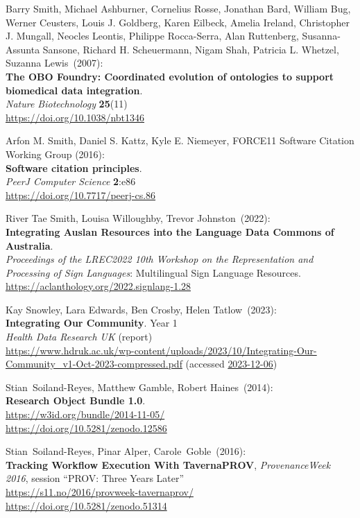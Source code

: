 \begin{thebibliography}{9}
Barry Smith, Michael Ashburner, Cornelius Rosse, Jonathan Bard, William
Bug, Werner Ceusters, Louis J. Goldberg, Karen Eilbeck, Amelia Ireland,
Christopher J. Mungall, Neocles Leontis, Philippe Rocca-Serra, Alan
Ruttenberg, Susanna-Assunta Sansone, Richard H. Scheuermann, Nigam Shah,
Patricia L. Whetzel, Suzanna Lewis~(2007): \\
\textbf{The {OBO Foundry}:
Coordinated evolution of ontologies to support biomedical data
integration}. \\
\emph{Nature Biotechnology} \textbf{25}(11) \\
\url{https://doi.org/10.1038/nbt1346}

Arfon M. Smith, Daniel S. Kattz, Kyle E. Niemeyer, FORCE11 Software Citation Working Group (2016):\\
\textbf{Software citation principles}.\\
\emph{PeerJ Computer Science} \textbf{2}:e86\\
\url{https://doi.org/10.7717/peerj-cs.86}

River Tae Smith, Louisa Willoughby, Trevor Johnston~(2022): \\
\textbf{Integrating Auslan Resources into the Language Data Commons of Australia}.\\
\emph{Proceedings of the LREC2022 10th Workshop on the Representation and Processing of Sign Languages}: Multilingual Sign Language Resources.\\
\url{https://aclanthology.org/2022.signlang-1.28}

Kay Snowley, Lara Edwards, Ben Crosby, Helen Tatlow~(2023): \\
\textbf{Integrating Our Community}. Year 1 \\
\emph{Health Data Research UK} (report) \\
\url{https://www.hdruk.ac.uk/wp-content/uploads/2023/10/Integrating-Our-Community_v1-Oct-2023-compressed.pdf}
(accessed \href{}{2023-12-06})

Stian~Soiland-Reyes, Matthew Gamble, Robert Haines~(2014): \\
\textbf{Research Object Bundle 1.0}.\\
\url{https://w3id.org/bundle/2014-11-05/}\\
\url{https://doi.org/10.5281/zenodo.12586}

Stian~Soiland-Reyes, Pinar Alper, Carole~Goble~(2016): \\
\textbf{Tracking Workflow Execution With TavernaPROV},
\emph{ProvenanceWeek 2016}, session ``PROV: Three Years Later''\\
\url{https://s11.no/2016/provweek-tavernaprov/}\\
\url{https://doi.org/10.5281/zenodo.51314}


\end{thebibliography}
